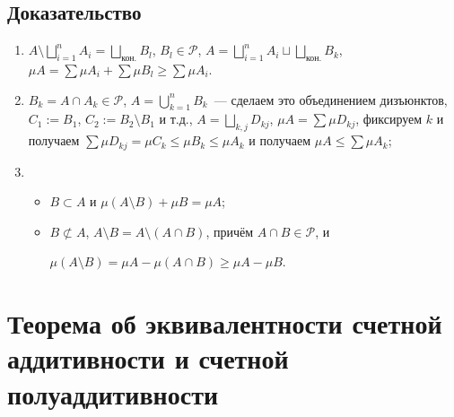 \documentclass{article}
\begin{document}
        \subsection{Доказательство}
        
            \begin{enumerate}
            
                \item $A \setminus \bigsqcup\limits^n_{i = 1} A_i = \bigsqcup\limits_{\text{кон.}} B_l$, $B_l \in \mathcal{P}$, $A = \bigsqcup\limits^n_{i = 1} A_i \sqcup \bigsqcup\limits_{\text{кон.}} B_k$, $\mu A = \sum \mu A_i + \sum \mu B_l \geqslant \sum \mu A_i$.
                
                \item $B_k = A \cap A_k \in \mathcal{P}$, $A = \bigcup\limits^n_{k = 1} B_k$~--- сделаем это объединением дизъюнктов, $C_1 := B_1$, $C_2 := B_2 \setminus B_1$ и т.д., $A = \bigsqcup\limits_{k, j} D_{kj}$, $\mu A = \sum \mu D_{kj}$, фиксируем $k$ и получаем $\sum \mu D_{kj} = \mu C_k \leqslant \mu B_k \leqslant \mu A_k$ и получаем $\mu A \leqslant \sum \mu A_k$;
                
                \item
                    
                    \begin{itemize}
                    
                        \item $B \subset A$ и $\mu \left( A \setminus B \right) + \mu B = \mu A$;
                        
                        \item $B \not\subset A$, $A \setminus B = A \setminus (A \cap B)$, причём $A \cap B \in \mathcal{P}$, и
                        
                            $\mu \left( A \setminus B \right) = \mu A - \mu \left( A \cap B \right) \geqslant \mu A - \mu B$.
                            
                    \end{itemize}
                    
            \end{enumerate}
            
    \newpage
    
    \section{Теорема об эквивалентности счетной аддитивности и счетной полуаддитивности}
    
\end{document}
